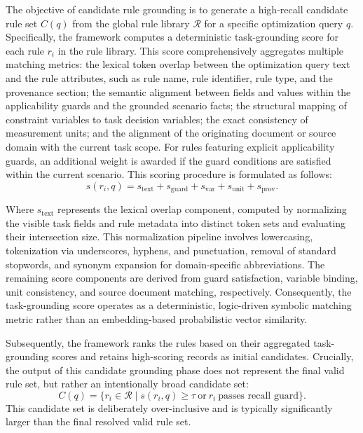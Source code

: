 ﻿\documentclass[a4paper,fleqn]{cas-dc}
\begin{document}
The objective of candidate rule grounding is to generate a high-recall candidate rule set $C(q)$ from the global rule library $\mathcal{R}$ for a specific optimization query $q$. Specifically, the framework computes a deterministic task-grounding score for each rule $r_i$ in the rule library. This score comprehensively aggregates multiple matching metrics: the lexical token overlap between the optimization query text and the rule attributes, such as rule name, rule identifier, rule type, and the provenance section; the semantic alignment between fields and values within the applicability guards and the grounded scenario facts; the structural mapping of constraint variables to task decision variables; the exact consistency of measurement units; and the alignment of the originating document or source domain with the current task scope. For rules featuring explicit applicability guards, an additional weight is awarded if the guard conditions are satisfied within the current scenario. This scoring procedure is formulated as follows:
\begin{equation}
s(r_i,q) = s_{\mathrm{text}} + s_{\mathrm{guard}} + s_{\mathrm{var}} + s_{\mathrm{unit}} + s_{\mathrm{prov}}.
\end{equation}

Where $s_{\mathrm{text}}$ represents the lexical overlap component, computed by normalizing the visible task fields and rule metadata into distinct token sets and evaluating their intersection size. This normalization pipeline involves lowercasing, tokenization via underscores, hyphens, and punctuation, removal of standard stopwords, and synonym expansion for domain-specific abbreviations. The remaining score components are derived from guard satisfaction, variable binding, unit consistency, and source document matching, respectively. Consequently, the task-grounding score operates as a deterministic, logic-driven symbolic matching metric rather than an embedding-based probabilistic vector similarity.

Subsequently, the framework ranks the rules based on their aggregated task-grounding scores and retains high-scoring records as initial candidates. Crucially, the output of this candidate grounding phase does not represent the final valid rule set, but rather an intentionally broad candidate set:
\begin{equation}
C(q) = \{r_i \in \mathcal{R} \mid s(r_i,q) \ge \tau \ \text{or}\ r_i\ \text{passes recall guard}\}.
\end{equation}
This candidate set is deliberately over-inclusive and is typically significantly larger than the final resolved valid rule set.
\end{document}
